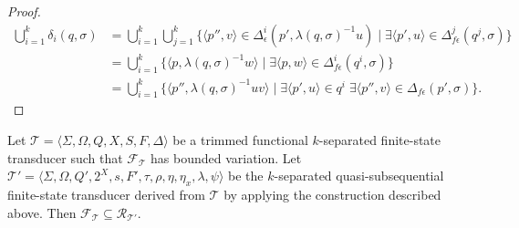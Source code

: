 \begin{proof}
  \begin{align*}
    \bigcup_{i=1}^k \delta_i(q, \sigma)
    &= \bigcup_{i=1}^k \bigcup_{j=1}^k \{ \langle p'', v \rangle \in
    \Delta_\epsilon^i(p', \lambda(q, \sigma)^{-1}u) \mid \exists \langle p', u
    \rangle \in \Delta_{f\epsilon}^j(q^j, \sigma) \}\\
    &= \bigcup_{i=1}^k \{ \langle p, \lambda(q, \sigma)^{-1}w \rangle \mid \exists
    \langle p, w \rangle \in \Delta_{f\epsilon}^i(q^i, \sigma) \}\\
    &= \bigcup_{i=1}^k \{ \langle p'', \lambda(q, \sigma)^{-1}uv \rangle \mid \exists
    \langle p', u \rangle \in q^i \; \exists \langle p'', v \rangle \in
    \Delta_{f\epsilon}(p', \sigma) \}.
  \end{align*}
\end{proof}

\begin{lemma}\label{lem:quasisubseq_inclusion_right}
  Let $\mathcal{T} = \langle \Sigma, \Omega, Q, X, S, F, \Delta \rangle$ be a trimmed
  functional $k$-separated finite-state transducer such that
  $\mathcal{F}_\mathcal{T}$ has bounded variation.
  Let $\mathcal{T}' = \langle \Sigma, \Omega, Q', 2^X, s, F', \tau, \rho, \eta,
  \eta_x, \lambda, \psi \rangle$ be the $k$-separated quasi-subsequential
  finite-state transducer derived from $\mathcal{T}$ by applying the construction
  described above. Then $\mathcal{F}_\mathcal{T} \subseteq \mathcal{R}_\mathcal{T'}$.
\end{lemma}

